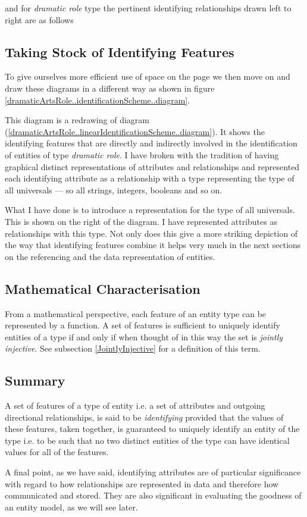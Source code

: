 and for \textit{dramatic role} type the pertinent identifying relationships drawn left to right are as follows
\begin{equation}
\label{dramaticArtsRole..linearIdentificationScheme..diagram}

\end{equation}

\subsection{Taking Stock of Identifying Features}
To give ourselves more efficient use of space on the page we then move on and draw these  diagrams in a  different way as shown in figure
\ref{dramaticArtsRole..identificationScheme..diagram}.

{
This diagram is a redrawing of diagram 
(\ref{dramaticArtsRole..linearIdentificationScheme..diagram}). It shows the identifying features that are directly and indirectly involved in the identification of entities of type \textit{dramatic role}.
I have broken with the tradition of having graphical distinct representations of attributes and relationships and represented each identifying attribute as a relationship with a type representing the type of all universals --- so all strings, integers, booleans and so on. 
}

What I have done is to introduce a representation for the type of all universals. This is shown on the right of the diagram.  I have represented  attributes as relationships with this type.  Not only does this give a more striking depiction of the way that identifying features combine it helps very much in the next sections on the referencing and the data representation of entities.

\subsection {Mathematical Characterisation}
\mynote From a mathematical perspective, 
each feature of an entity type can be represented by a function. A set of features is sufficient to uniquely identify entities of a type if and only if when thought  of in this way the set is \textit{jointly injective}.   
See subsection \ref{JointlyInjective} for a definition of this term.

\subsection{Summary}
\mynote A set of features of a type of entity i.e. a set of attributes and outgoing directional relationships, is said to be \textit{identifying} provided that the values of these features,
taken together, is guaranteed to uniquely identify an entity of the type i.e. to be such that no two distinct entities of the type can have identical values for all of the features. 

\mynote A final point, as we have said, identifying attributes are of particular significance with regard to 
 how relationships are represented in data and therefore how communicated and stored.
They are also significant in evaluating the goodness of an entity model, as we will see later.
